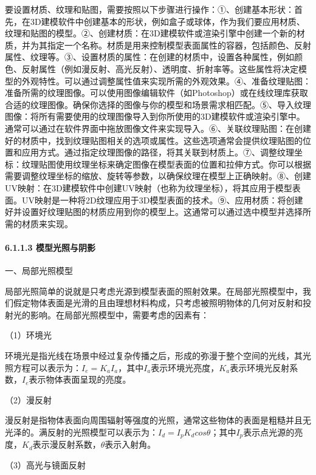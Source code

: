 要设置材质、纹理和贴图，需要按照以下步骤进行操作：①、创建基本形状：首先，在3D建模软件中创建基本的形状，例如盒子或球体，作为我们要应用材质、纹理和贴图的模型。②、创建材质：在3D建模软件或渲染引擎中创建一个新的材质，并为其指定一个名称。材质是用来控制模型表面属性的容器，包括颜色、反射属性、纹理等。③、设置材质的属性：在创建的材质中，设置各种属性，例如颜色、反射属性（例如漫反射、高光反射）、透明度、折射率等。这些属性将决定模型的外观特性。可以通过调整属性值来实现所需的外观效果。④、准备纹理贴图：准备所需的纹理图像。可以使用图像编辑软件（如Photoshop）或在线纹理库获取合适的纹理图像。确保你选择的图像与你的模型和场景需求相匹配。⑤、导入纹理图像：将所有需要使用的纹理图像导入到你所使用的3D建模软件或渲染引擎中。通常可以通过在软件界面中拖放图像文件来实现导入。⑥、关联纹理贴图：在创建好的材质中，找到纹理贴图相关的选项或属性。这些选项通常会提供纹理贴图的位置和应用方式。通过指定纹理图像的路径，将其关联到材质上。⑦、调整纹理坐标：纹理贴图使用纹理坐标来确定图像在模型表面的位置和拉伸方式。你可以根据需要调整纹理坐标的缩放、旋转等参数，以确保纹理在模型上正确映射。⑧、创建UV映射：在3D建模软件中创建UV映射（也称为纹理坐标），将其应用于模型表面。UV映射是一种将2D纹理应用于3D模型表面的技术。⑨、应用材质：将创建好并设置好纹理贴图的材质应用到你的模型上。这通常可以通过选中模型并选择所需的材质来实现。

\hypertarget{ux6a21ux578bux5149ux7167ux4e0eux9634ux5f71}{%
\paragraph{6.1.1.3 模型光照与阴影}\label{ux6a21ux578bux5149ux7167ux4e0eux9634ux5f71}}

一、局部光照模型

局部光照简单的说就是只考虑光源到模型表面的照射效果。在局部光照模型中，我们假定物体表面是光滑的且由理想材料构成，只考虑被照明物体的几何对反射和投射光的影响。在局部光照模型中，需要考虑的因素有：

（1）环境光

环境光是指光线在场景中经过复杂传播之后，形成的弥漫于整个空间的光线，其光照方程可以表示为：\(I_e=K_aI_a\)，其中\(I_a\)表示环境光亮度，\(K_a\)表示环境光反射系数，\(I_e\)表示物体表面呈现的亮度。

（2）漫反射

漫反射是指物体表面向周围辐射等强度的光照，通常这些物体的表面是粗糙并且无光泽的。满反射的光照模型可以表示为：\(I_d=I_pK_d cos \theta\)；其中\(I_p\)表示点光源的亮度，\(K_d\)表示漫反射系数，\(\theta\)表示入射角。

（3）高光与镜面反射


